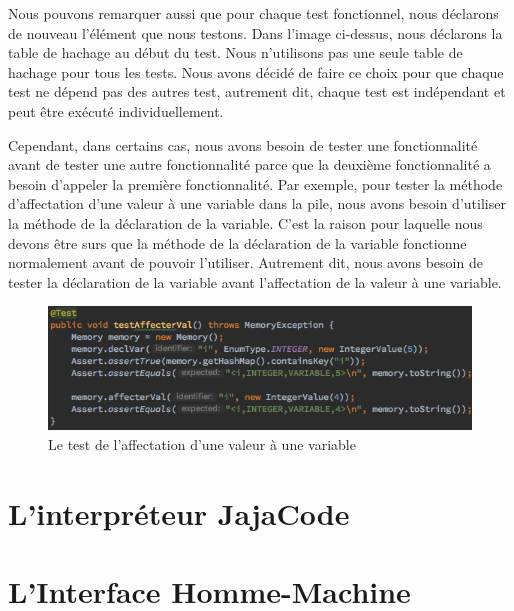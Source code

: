 \documentclass[a4paper,12pt]{report}
\begin{document}
Nous pouvons remarquer aussi que pour chaque test fonctionnel, nous déclarons de nouveau l'élément que nous testons. Dans l'image ci-dessus, nous déclarons la table de hachage au début du test. Nous n'utilisons pas une seule table de hachage pour tous les tests. Nous avons décidé de faire ce choix pour que chaque test ne dépend pas des autres test, autrement dit, chaque test est indépendant et peut être exécuté individuellement. 

Cependant, dans certains cas, nous avons besoin de tester une fonctionnalité avant de tester une autre fonctionnalité parce que la deuxième fonctionnalité a besoin d'appeler la première fonctionnalité. Par exemple, pour tester la méthode d'affectation d'une valeur à une variable dans la pile, nous avons besoin d'utiliser la méthode de la déclaration de la variable. C'est la raison pour laquelle nous devons être surs que la méthode de la déclaration de la variable fonctionne normalement avant de pouvoir l'utiliser. Autrement dit, nous avons besoin de tester la déclaration de la variable avant l'affectation de la valeur à une variable.

\begin{figure}[H]
\begin{center}
	\includegraphics[scale=0.5]{testaffectation}
	\caption{Le test de l'affectation d'une valeur à une variable}
\end{center}
\end{figure}


\section{L'interpréteur JajaCode}
\paragraph{}
\section{L'Interface Homme-Machine}
\end{document}
